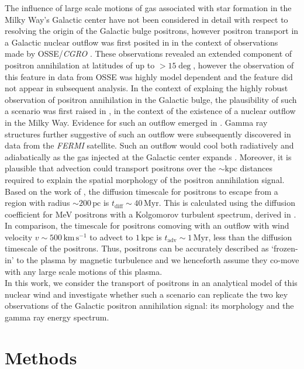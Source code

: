 \documentclass[a4paper,fleqn,usenatbib]{mnras}
\begin{document}
The influence of large scale motions of gas associated with star formation in the Milky Way's Galactic center have not been considered in detail with respect to resolving the origin of the Galactic bulge positrons, however positron transport in a Galactic nuclear outflow was first posited in \cite{Dermer97} in the context of observations made by OSSE/\textit{CGRO} \citep{Purcell97}. These observations revealed an extended component of positron annihilation at latitudes of up to $>15\deg$, however the observation of this feature in data from OSSE was highly model dependent \citep{Milne01b} and the feature did not appear in subsequent analysis. In the context of explaing the highly robust observation of positron annihilation in the Galactic bulge, the plausibility of such a scenario was first raised in \cite{Crocker2011}, in the context of the existence of a nuclear outflow in the Milky Way. Evidence for such an outflow emerged in \cite{BHC03}. Gamma ray structures further suggestive of such an outflow \citep[the `Fermi Bubbles';][]{Su10} were subsequently discovered in data from the \textit{FERMI} satellite. Such an outflow would cool both radiatively and adiabatically as the gas injected at the Galactic center expands \citep{Crocker15}. Moreover, it is plausible that advection could transport positrons over the $\sim\mathrm{kpc}$ distances required to explain the spatial morphology of the positron annihilation signal. Based on the work of \cite{Jean09}, the diffusion timescale for positrons to escape from a region with radius $\sim 200\,\mathrm{pc}$ is $t_\mathrm{diff} \sim 40\,\mathrm{Myr}$. This is calculated using the diffusion coefficient for MeV positrons with a Kolgomorov turbulent spectrum, derived in \cite{Jean09}. In comparison, the timescale for positrons comoving with an outflow with wind velocity $v \sim 500\,\mathrm{km\,s^{-1}}$ \citep{Crocker15} to advect to $1\,\mathrm{kpc}$ is $t_\mathrm{adv}\sim 1\,\mathrm{Myr}$, less than the diffusion timescale of the positrons. Thus, positrons can be accurately described as `frozen-in' to the plasma by magnetic turbulence and we henceforth assume they co-move with any large scale motions of this plasma.\\
In this work, we consider the transport of positrons in an analytical model of this nuclear wind and investigate whether such a scenario can replicate the two key observations of the Galactic positron annihilation signal: its morphology and the gamma ray energy spectrum.
\section{Methods}\label{sec:meth}
\end{document}
